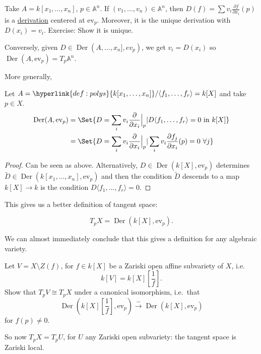 \documentclass{article}
\newcommand{\A}{\mathbb{A}}
\DeclareMathOperator{\Der}{Der}
\begin{document}
\begin{eg}
    Take $A = k[x_1, \dotsc, x_n]$, $p \in \A^n$.
    If $(v_1, \dotsc, v_n) \in \A^n$, then $D(f) = \sum v_i \frac{\partial f}{\partial x_i} (p)$ is a \hyperlink{def:derivation}{derivation} centered at $\text{ev}_p$.
    Moreover, it is the unique derivation with $D(x_i) = v_i$. Exercise: Show it is unique.

    Conversely, given $D \in \Der(A, \dotsc, x_n], ev_p)$, we get $v_i = D(x_i)$ so $\Der(A, \text{ev}_p) = T_p \A^n$.
\end{eg}
More generally,
\begin{lemma}
    Let $A = \hyperlink{def:polys}{k[x_1, \dotsc, x_n]}/\langle f_1, \dotsc, f_r \rangle = k[X]$ and take $p \in X$.
    \begin{align*}
        \Der(A, \text{ev}_p) &= \Set{D = \sum_i v_i \frac{\partial}{\partial x_i}\Big\rvert_p | D \langle f_1, \dotsc, f_r \rangle = 0 \text{ in } k[X]} \\
                             &= \Set{D = \sum_i v_i \frac{\partial}{\partial x_i}\Big\rvert_p | \sum_i v_i \frac{\partial f_j}{\partial x_i}(p) = 0 \ \forall j}
    \end{align*}
\end{lemma}
\begin{proof}
    Can be seen as above.
    Alternatively, $D \in \Der(k[X], \text{ev}_p)$ determines $\tilde{D} \in \Der(k[x_1, \dotsc, x_n], \text{ev}_p)$ and then the condition $\tilde{D}$ descends to a map $k[X] \to k$ is the condition $D\langle f_1, \dotsc, f_r \rangle = 0$.
\end{proof}
This gives us a better definition of tangent space:
\begin{defi}
    \begin{equation*}
        T_p X = \Der(k[X], \text{ev}_p).
    \end{equation*}
\end{defi}
We can almost immediately conclude that this gives a definition for any algebraic variety.
\begin{ex}
    Let $V = X \setminus Z(f)$, for $f \in k[X]$ be a Zariski open affine subvariety of $X$, i.e.\
    \begin{equation*}
        k[V] = k[X]\left[\frac{1}{f}\right].
    \end{equation*}
    Show that $T_p V \cong T_p X$ under a canonical isomorphism, i.e.\ that
    \begin{equation*}\Der\left(k[X]\left[\frac{1}{f}\right], \text{ev}_p\right) \xrightarrow{\sim} \Der(k[X], \text{ev}_p)\end{equation*}
    for $f(p) \neq 0$.
\end{ex}
So now $T_p X = T_p U$, for $U$ any Zariski open subvariety: the tangent space is Zariski local.
\end{document}
